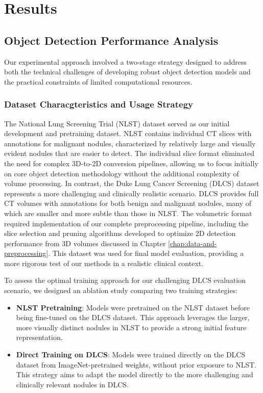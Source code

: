\chapter{Results}
\section{Object Detection Performance Analysis}

Our experimental approach involved a two-stage strategy designed to address both the technical challenges of developing robust object detection models and the practical constraints of limited computational resources.

\subsection{Dataset Characgteristics and Usage Strategy}
The National Lung Screening Trial (NLST) dataset served as our initial development and pretraining dataset. NLST contains individual CT slices with annotations for malignant nodules, characterized by relatively large and visually evident nodules that are easier to detect. The individual slice format eliminated the need for complex 3D-to-2D conversion pipelines, allowing us to focus initially on core object detection methodology without the additional complexity of volume processing.
In contrast, the Duke Lung Cancer Screening (DLCS) dataset represents a more challenging and clinically realistic scenario. DLCS provides full CT volumes with annotations for both benign and malignant nodules, many of which are smaller and more subtle than those in NLST. The volumetric format required implementation of our complete preprocessing pipeline, including the slice selection and pruning algorithms developed to optimize 2D detection performance from 3D volumes discussed in Chapter \ref{chap:data-and-preprocessing}. This dataset was used for final model evaluation, providing a more rigorous test of our methods in a realistic clinical context.

To assess the optimal training approach for our challenging DLCS evaluation scenario, we designed an ablation study comparing two training strategies:
\begin{itemize}
    \item \textbf{NLST Pretraining}: Models were pretrained on the NLST dataset before being fine-tuned on the DLCS dataset. This approach leverages the larger, more visually distinct nodules in NLST to provide a strong initial feature representation.
    \item \textbf{Direct Training on DLCS}: Models were trained directly on the DLCS dataset from ImageNet-pretrained weights, without prior exposure to NLST. This strategy aims to adapt the model directly to the more challenging and clinically relevant nodules in DLCS.
\end{itemize}

